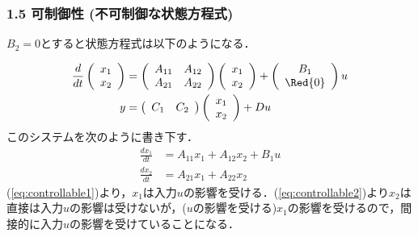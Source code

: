 \begin{frame}[t]
\frametitle{1.5 可制御性 (不可制御な状態方程式)}

$B_2=0$とすると状態方程式は以下のようになる．


\begin{align}
 \frac{d}{dt}
  \left(\begin{array}{c}
         {x}_1 \\
	 {x}_2
	\end{array}\right)
  &=
  \left(\begin{array}{cc}
         {A}_{11} & {A}_{12} \\
	     {A}_{21} & {A}_{22}
	\end{array}\right)
  \left(\begin{array}{c}
         {x}_1 \\
	 {x}_2
	\end{array}\right)
  +
  \left(\begin{array}{c}
         {B}_1 \\
	 \Red{0}
	\end{array}\right)
  u \\
 y &=
  \left(\begin{array}{cc}
         {C}_1 & {C}_2
	\end{array}\right)
  \left(\begin{array}{c}
         {x}_1 \\
	 {x}_2
	\end{array}\right)
  + D u
\end{align}
このシステムを次のように書き下す．
\begin{align}
 \frac{dx_1}{dt} &= A_{11} x_1 + A_{12} x_2 + B_1 u
\label{eq:controllable1} \\
 \frac{dx_2}{dt} &= A_{21} x_1 + A_{22} x_2
\label{eq:controllable2}
\end{align}
(\ref{eq:controllable1})より，$x_1$は入力$u$の影響を受ける．(\ref{eq:controllable2})より$x_2$は直接は入力$u$の影響は受けないが，($u$の影響を受ける)$x_1$の影響を受けるので，間接的に入力$u$の影響を受けていることになる．
\end{frame}



